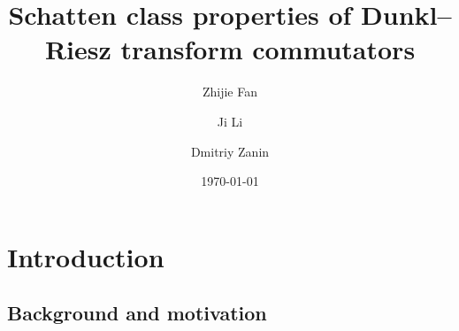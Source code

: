 \documentclass{amsart}
\numberwithin{equation}{section}
\begin{document}
\newtheorem{cl}{Claim}
\newtheorem{theorem}{Theorem}[section]
\newtheorem{proposition}[theorem]{Proposition}
\newtheorem{coro}[theorem]{Corollary}
\newtheorem{lemma}[theorem]{Lemma}
\newtheorem{definition}[theorem]{Definition}
\newtheorem{nota}[theorem]{Notation}
\newtheorem{assum}{Assumption}[section]
\newtheorem{example}[theorem]{Example}
\newtheorem{remark}[theorem]{Remark}
\newtheorem{construction}[theorem]{Construction}


\title[Schatten class properties of Dunkl--Riesz transform commutators]{Schatten class properties of Dunkl--Riesz transform commutators}



\author{Zhijie Fan}
\address{Zhijie Fan, School of Mathematical Sciences, South China Normal University, Guangzhou 510631, China}

\author{Ji Li}
\address{Ji Li, Department of Mathematics, Macquarie University, NSW 2109, Australia}


\author{Dmitriy Zanin}
\address{School of Mathematics and Statistics, Central South University, Changsha 410075, People's Republic of China}






  \date{\today}





\begin{abstract}

\end{abstract}

\maketitle


\tableofcontents

\section{Introduction}
\subsection{Background and motivation}
\end{document}
